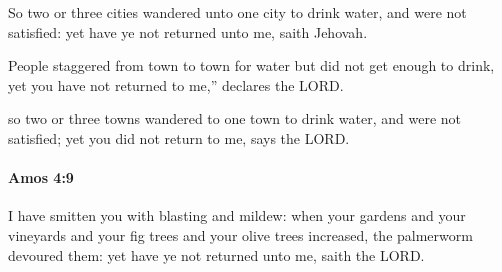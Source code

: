 			\begin{versebox}
					\item[BHS] 
					\item[LXX] 
					\item[ASV] So two or three cities wandered unto one city to drink water, and were not satisfied: yet have ye not returned unto me, saith Jehovah.
					\item[NIV] People staggered from town to town for water but did not get enough to drink, yet you have not returned to me,” declares the LORD.
					\item[NRSV] so two or three towns wandered to one town to drink water, and were not satisfied; yet you did not return to me, says the LORD.
			\end{versebox}

		\paragraph{Amos 4:9} %
			\label{AMOS-4-9}

			I have smitten you with blasting and mildew: when your gardens and your vineyards and your fig trees and your olive trees increased, the palmerworm devoured them: yet have ye not returned unto me, saith the LORD.

